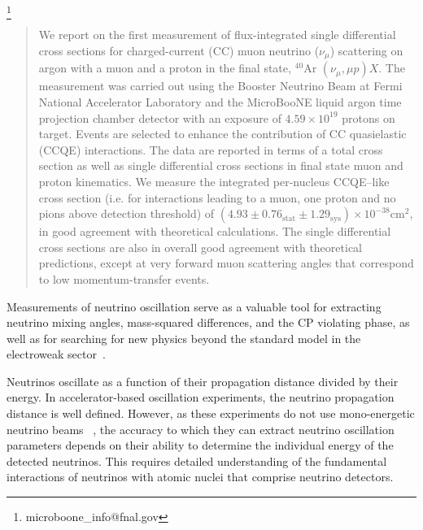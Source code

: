 \documentclass[aps,prl,showpacs,twocolumn,superscriptaddress,letterpaper,longbibliography]{revtex4-1}
\newcommand{\argon}{$^{40}$Ar\,\,}
\begin{document}
 \thanks{microboone\_info@fnal.gov}\noaffiliation



\begin{abstract}
We report on the first measurement of flux-integrated single differential cross sections for charged-current (CC) muon neutrino  ($\nu_{\mu}$) scattering on argon with a muon and a 
proton in the final state, \argon$(\nu_{\mu},\mu p)X$. 
The measurement was carried out using the Booster Neutrino Beam at Fermi National Accelerator Laboratory and the MicroBooNE liquid argon time projection chamber detector with 
an exposure of $4.59 \times 10^{19}$ protons on target. 
Events are selected to enhance the contribution of CC quasielastic (CCQE) interactions.
The data are reported in terms of a 
total cross section as well as single differential cross sections in final state muon and proton kinematics. 
We measure the integrated per-nucleus CCQE--like cross section (i.e. for interactions leading to a muon, one proton and no pions above detection threshold) of $(4.93\pm 0.76_\text{stat} \pm 1.29_\text{sys} ) \times 10^{-38} \textrm{cm}^2$, in good agreement with theoretical calculations. 
The single differential cross sections are also 
in overall good agreement with theoretical predictions, except at very forward muon scattering angles that correspond to low momentum-transfer events.
\end{abstract}

%
\maketitle



Measurements of neutrino oscillation serve as a valuable tool for extracting 
neutrino mixing angles, mass-squared differences, and the CP violating phase, 
as well as for searching for new physics beyond the standard model in the electroweak sector~\cite{pdg2018,T2KNature20}.

Neutrinos oscillate as a function of their propagation distance divided by their energy.
In accelerator-based oscillation experiments, the neutrino propagation distance is well defined.
However, as these experiments do not use mono-energetic neutrino beams 
~\cite{AguilarArevalo:2008yp,Aliaga:2016av,Abe:2012av},
the accuracy to which they can extract neutrino oscillation parameters depends 
on their ability to determine the individual energy of the detected neutrinos.
This requires detailed understanding of the fundamental interactions 
of neutrinos with atomic nuclei that comprise neutrino detectors.
\end{document}

